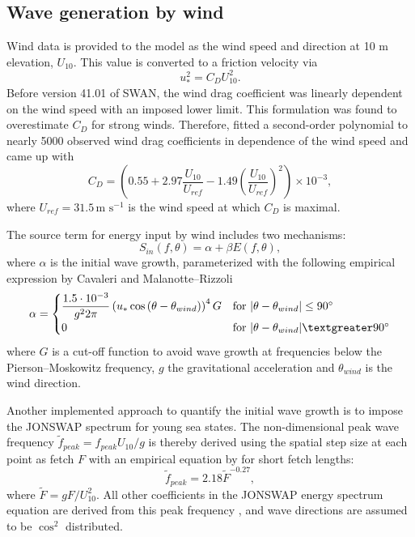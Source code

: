 \subsection{Wave generation by wind}

Wind data is provided to the model as the wind speed and direction at 10 m elevation, $U_{10}$. This value is converted to a friction velocity via
\begin{equation}
 u_\ast^2 = C_D U_{10}^2.
\end{equation}
Before version 41.01 of SWAN, the wind drag coefficient was linearly dependent on the wind speed with an imposed lower limit. This formulation was found to overestimate $C_D$ for strong winds. Therefore, \cite{zijlema2012} fitted a second-order polynomial to nearly 5000 observed wind drag coefficients in dependence of the wind speed and came up with 
\begin{equation}
 C_D = \left( 0.55 + 2.97 \dfrac{U_{10}}{U_{ref}} - 1.49 \left( \dfrac{U_{10}}{U_{ref}} \right)^2 \right) \times 10^{-3} ,
\end{equation}
where $U_{ref} = 31.5 \, \text{m s}^{-1}$ is the wind speed at which $C_D$ is maximal.

The source term for energy input by wind includes two mechanisms:
\begin{equation}\label{gen}
 S_{in} (f, \theta) = \alpha + \beta E(f,\theta),
\end{equation}
where $\alpha$ is the initial wave growth, parameterized with the following empirical expression by Cavaleri and Malanotte--Rizzoli
\begin{equation}
 \alpha = 
 \begin{cases}
  \dfrac{1.5 \cdot 10^{-3}}{g^2 2 \pi} \left(u_\ast \cos{(\theta - \theta_{wind})}\right)^4 G & \text{for } |\theta - \theta_{wind}| \le 90^\circ  \\
  0 & \text{for } |\theta - \theta_{wind}| \textgreater 90^\circ  \\
 \end{cases}
\end{equation}
where $G$ is a cut-off function to avoid wave growth at frequencies below the Pierson--Moskowitz frequency, $g$ the gravitational acceleration and $\theta_{wind}$ is the wind direction. 

Another implemented approach to quantify the initial wave growth is to impose the JONSWAP spectrum for young sea states. The non-dimensional peak wave frequency $\tilde{f}_{peak} = f_{peak} U_{10} / g$ is thereby derived using the spatial step size at each point as fetch $F$ with an empirical equation by \cite{kahma1992} for short fetch lengths:
\begin{equation}
 \tilde{f}_{peak} = 2.18 \tilde{F}^{-0.27},
\end{equation}
where $\tilde{F} = g F / U_{10}^2$. All other coefficients in the JONSWAP energy spectrum equation are derived from this peak frequency \citep[][]{holthuijsen2007}, and  wave directions are assumed to be $\cos^2$ distributed.

